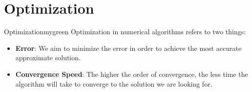 \vspace{0.35cm}

\section{Optimization}
\begin{prettyBox}{Optimization}{mygreen}
Optimization in numerical algorithms refers to two things:
\begin{itemize}
    \item \textbf{Error}: We aim to minimize the error in order to achieve the most accurate approximate solution.
    \item \textbf{Convergence Speed}: The higher the order of convergence, the less time the algorithm will take to converge to the solution we are looking for.
\end{itemize}
\end{prettyBox}

